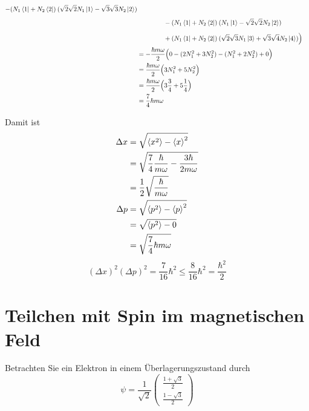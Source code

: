 \documentclass{scrartcl}
\begin{document}
\begin{enumerate}[a)]
\begin{align*}
					- (N_1 \bra 1 + N_2 \bra 2)\: (\sqrt 2 \sqrt 2 N_1\ket 1 - \sqrt 3 \sqrt 3  N_2\ket 2) \\
				&\phantom{=\frac 12 \frac{\hbar}{m\omega} \Big(}
					- (N_1 \bra 1 + N_2 \bra 2)\: (N_1\ket 1 - \sqrt 2 \sqrt 2 N_2\ket 2) \\
				&\phantom{=\frac 12 \frac{\hbar}{m\omega} \Big(}
					+ (N_1 \bra 1 + N_2 \bra 2)\:(\sqrt 2 \sqrt 3 N_1\ket 3 + \sqrt  3 \sqrt 4 N_2\ket 4) \Big)\\		
				&=  -\frac{\hbar m \omega}{2}  \Big(
					0 -(2N_1^2 + 3 N_2^2) - (N_1^2 + 2 N_2^2) + 0
				\Big)\\	
				&= \frac{\hbar m \omega}{2}  \Big( 3N_1^2 + 5 N_2^2 \Big)\\
				&= \frac{\hbar m \omega}{2} \Big( 3\frac{3}{4} + 5 \frac{1}{4} \Big) \\
				&= \frac 74 \hbar m \omega \\
\end{align*}

Damit ist 
\begin{align*}
\Delta x	&= \sqrt{\braket{x^2}-\braket{x}^2}	\\
			&= \sqrt{\frac 74 \frac{\hbar}{m\omega} - \frac{3\hbar}{2m\omega}} \\
			&= \frac{1}{2}\sqrt{\frac{\hbar}{m\omega}} \\
\Delta p	&= \sqrt{\braket{p^2}-\braket{p}^2}	\\
			&= \sqrt{\braket{p^2}-0}	\\
			&= \sqrt{\frac 74 \hbar m \omega}
\end{align*}
\[(\Delta x)^2 (\Delta p)^2 = \frac{7}{16}\hbar^2 \leq \frac{8}{16}\hbar^2 = \frac{\hbar^2}{2}\]
\end{enumerate}

\section{Teilchen mit Spin im magnetischen Feld}
Betrachten Sie ein Elektron in einem Überlagerungszustand durch
\[\psi=\frac{1}{\sqrt 2}\begin{pmatrix}\frac{1+\sqrt 3}{2}\\\frac{1-\sqrt 3}{2}\end{pmatrix}\]
\end{document}
